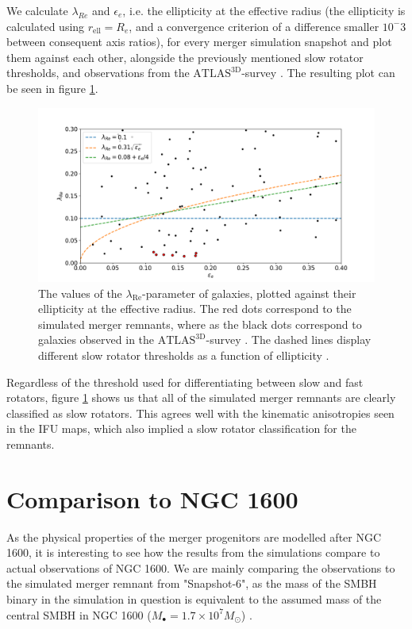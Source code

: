 \documentclass[english, oneside]{HYgradu}
\begin{document}
We calculate $\lambda_{Re}$ and $\epsilon_e$, i.e. the ellipticity at the effective radius (the ellipticity is calculated using $r_\mathrm{ell} = R_e$, and a convergence criterion of a difference smaller $10^-3$ between consequent axis ratios), for every merger simulation snapshot and plot them against each other, alongside the previously mentioned slow rotator thresholds, and observations from the $\mathrm{ATLAS^{3D}}$-survey \citep{Cappellari2011}. The resulting plot can be seen in figure \ref{figure:lambda_epsilon}. 

\begin{figure}[h]
	\centering
	\includegraphics[width=\textwidth]{lambda_epsilon.png}
	\caption{The values of the $\lambda_{\mathrm{Re}}$-parameter of galaxies, plotted against their ellipticity at the effective radius. The red dots correspond to the simulated merger remnants, where as the black dots correspond to galaxies observed in the $\mathrm{ATLAS^{3D}}$-survey \citep{Cappellari2011, Emsellem2011}. The dashed lines display different slow rotator thresholds as a function of ellipticity \citep{Emsellem2007, Emsellem2011, Cappellari2016}.}
	\label{figure:lambda_epsilon}
\end{figure}

Regardless of the threshold used for differentiating between slow and fast rotators, figure \ref{figure:lambda_epsilon} shows us that all of the simulated merger remnants are clearly classified as slow rotators. This agrees well with the kinematic anisotropies seen in the IFU maps, which also implied a slow rotator classification for the remnants.

\section{Comparison to NGC 1600}

As the physical properties of the merger progenitors are modelled after NGC 1600, it is interesting to see how the results from the simulations compare to actual observations of NGC 1600. We are mainly comparing the observations to the simulated merger remnant from "Snapshot-6", as the mass of the SMBH binary in the simulation in question is equivalent to the assumed mass of the central SMBH in NGC 1600 ($M_\bullet = 1.7 \times 10^7 M_\odot$) \citep{Thomas2016}.
\end{document}
